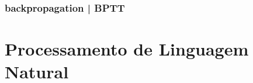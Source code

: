 \documentclass{automatextcc}
\begin{document}
\subsubsection{backpropagation | BPTT}


\section{Processamento de Linguagem Natural}
\end{document}
